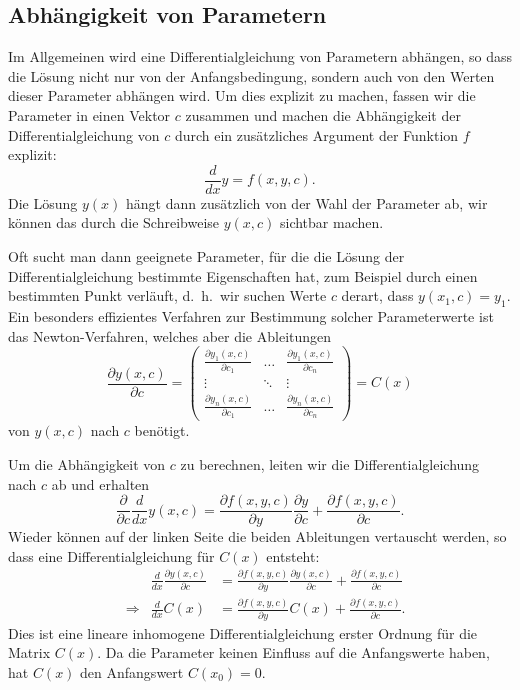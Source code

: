 \subsection{Abhängigkeit von Parametern}
%
Im Allgemeinen wird eine Differentialgleichung von Parametern abhängen,
so dass die Lösung nicht nur von der Anfangsbedingung, sondern auch von den
Werten dieser Parameter abhängen wird.
Um dies explizit zu machen, fassen wir die Parameter in einen Vektor $c$
zusammen und machen die Abhängigkeit der Differentialgleichung
von $c$ durch ein zusätzliches Argument der Funktion $f$ explizit:
\[
\frac{d}{dx}y = f(x,y,c).
\]
Die Lösung $y(x)$ hängt dann zusätzlich von der Wahl der Parameter
ab, wir können das durch die Schreibweise $y(x,c)$ sichtbar machen.

Oft sucht man dann geeignete Parameter, für die die Lösung der
Differentialgleichung bestimmte Eigenschaften hat, zum Beispiel durch
einen bestimmten Punkt verläuft, d.~h.~wir suchen Werte $c$ derart,
dass $y(x_1,c)=y_1$.
Ein besonders effizientes Verfahren zur Bestimmung solcher Parameterwerte
ist das Newton-Verfahren, welches aber die Ableitungen
%
\[
\frac{\partial y(x,c)}{\partial c}
=
\begin{pmatrix}
\displaystyle \frac{\partial y_1(x,c)}{\partial c_1}
	&\dots
		&\displaystyle \frac{\partial y_1(x,c)}{\partial c_n}\\
\vdots
	&\ddots
		&\vdots\\
\displaystyle \frac{\partial y_n(x,c)}{\partial c_1}
	&\dots
		&\displaystyle \frac{\partial y_n(x,c)}{\partial c_n}
\end{pmatrix}
=C(x)
\]
von $y(x,c)$ nach $c$ benötigt.

Um die Abhängigkeit von $c$ zu berechnen, leiten wir die
Differentialgleichung nach $c$ ab und erhalten 
\[
\frac{\partial}{\partial c} \frac{d}{dx} y(x,c)
=
\frac{\partial f(x,y,c)}{\partial y}\frac{\partial y}{\partial c}
+
\frac{\partial f(x,y,c)}{\partial c}.
\]
Wieder können auf der linken Seite die beiden Ableitungen vertauscht
werden, so dass eine Differentialgleichung für $C(x)$ entsteht:
\begin{align*}
&&
\frac{d}{dx}\frac{\partial y(x,c)}{\partial c}
&=
\frac{\partial f(x,y,c)}{\partial y}\frac{\partial y(x,c)}{\partial c}
+
\frac{\partial f(x,y,c)}{\partial c}
\\
&\Rightarrow&
\frac{d}{dx}C(x)
&=
\frac{\partial f(x,y,c)}{\partial y}C(x)
+
\frac{\partial f(x,y,c)}{\partial c}.
\end{align*}
Dies ist eine lineare inhomogene Differentialgleichung erster Ordnung
für die Matrix $C(x)$.
Da die Parameter keinen Einfluss auf die Anfangswerte haben, hat $C(x)$ den
Anfangswert $C(x_0)=0$.

